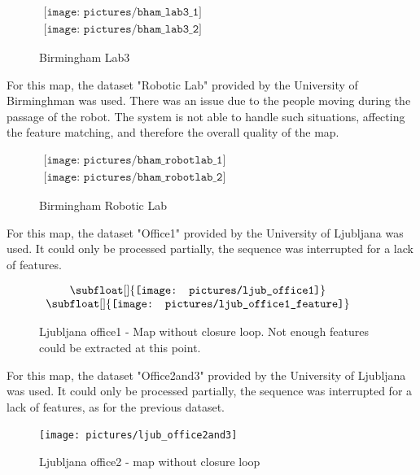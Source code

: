 \begin{figure}[H]
\centering$
 \begin{array}{c}
 \texttt{[image: pictures/bham\_lab3\_1]} \\
 \texttt{[image: pictures/bham\_lab3\_2]}
 \end{array}$
\caption{Birmingham Lab3}
\end{figure}

\clearpage
For this map, the dataset "Robotic Lab" provided by the University of Birminghman was used. There was an issue due to the people moving during the passage of the robot. The system is not able to handle such situations, affecting the feature matching, and therefore the overall quality of the map.

\begin{figure}[H]
\centering$
\begin{array}{c}
\texttt{[image: pictures/bham\_robotlab\_1]} \\
\texttt{[image: pictures/bham\_robotlab\_2]}
\end{array}$
\caption{Birmingham Robotic Lab}
\end{figure}

\clearpage
For this map, the dataset "Office1" provided by the University of Ljubljana was used. It could only be processed partially, the sequence was interrupted for a lack of features.

\begin{figure}[H]
\centering$
 \begin{array}{c}
 \subfloat[]{\label{fig:ljub1_1} \texttt{[image: pictures/ljub\_office1]}} \\
 \subfloat[]{\label{fig:ljub1_2} \texttt{[image: pictures/ljub\_office1\_feature]}}
 \end{array}$
\caption{Ljubljana office1 - \protect{} Map without closure loop. \protect{} Not enough features could be extracted at this point.}
\end{figure}

\clearpage
For this map, the dataset "Office2and3" provided by the University of Ljubljana was used. It could only be processed partially, the sequence was interrupted for a lack of features, as for the previous dataset.

\begin{figure}[H]
\centering
\texttt{[image: pictures/ljub\_office2and3]}
\caption{Ljubljana office2 - map without closure loop}
\end{figure}

